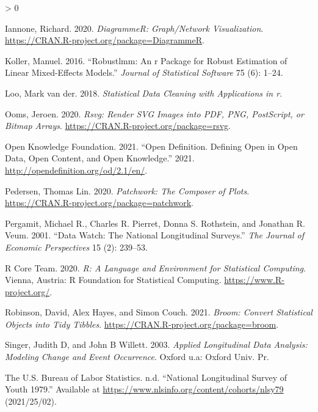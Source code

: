 \documentclass{article}
\newlength{\cslhangindent}
\newenvironment{CSLReferences}[2] %
 {%
  \setlength{\parindent}{0pt}
  \ifodd #1 \everypar{\setlength{\hangindent}{\cslhangindent}}\ignorespaces\fi
  \ifnum #2 > 0
  \setlength{\parskip}{#2\baselineskip}
  \fi
 }%
 {}
\begin{document}
\begin{CSLReferences}{1}{0}
\leavevmode\hypertarget{ref-DiagrammeR}{}%
Iannone, Richard. 2020. \emph{DiagrammeR: Graph/Network Visualization}. \url{https://CRAN.R-project.org/package=DiagrammeR}.

\leavevmode\hypertarget{ref-KollerManuel2016rARP}{}%
Koller, Manuel. 2016. {``Robustlmm: An r Package for Robust Estimation of Linear Mixed-Effects Models.''} \emph{Journal of Statistical Software} 75 (6): 1--24.

\leavevmode\hypertarget{ref-LooMarkvander2018Sdcw}{}%
Loo, Mark van der. 2018. \emph{Statistical Data Cleaning with Applications in r}.

\leavevmode\hypertarget{ref-rsvg}{}%
Ooms, Jeroen. 2020. \emph{Rsvg: Render SVG Images into PDF, PNG, PostScript, or Bitmap Arrays}. \url{https://CRAN.R-project.org/package=rsvg}.

\leavevmode\hypertarget{ref-opendata}{}%
Open Knowledge Foundation. 2021. {``Open Definition. Defining Open in Open Data, Open Content, and Open Knowledge.''} 2021. \url{http://opendefinition.org/od/2.1/en/}.

\leavevmode\hypertarget{ref-patchwork}{}%
Pedersen, Thomas Lin. 2020. \emph{Patchwork: The Composer of Plots}. \url{https://CRAN.R-project.org/package=patchwork}.

\leavevmode\hypertarget{ref-MichaelRPergamit2001DWTN}{}%
Pergamit, Michael R., Charles R. Pierret, Donna S. Rothstein, and Jonathan R. Veum. 2001. {``Data Watch: The National Longitudinal Surveys.''} \emph{The Journal of Economic Perspectives} 15 (2): 239--53.

\leavevmode\hypertarget{ref-R}{}%
R Core Team. 2020. \emph{R: A Language and Environment for Statistical Computing}. Vienna, Austria: R Foundation for Statistical Computing. \url{https://www.R-project.org/}.

\leavevmode\hypertarget{ref-broom}{}%
Robinson, David, Alex Hayes, and Simon Couch. 2021. \emph{Broom: Convert Statistical Objects into Tidy Tibbles}. \url{https://CRAN.R-project.org/package=broom}.

\leavevmode\hypertarget{ref-SingerJudithD2003Alda}{}%
Singer, Judith D, and John B Willett. 2003. \emph{Applied Longitudinal Data Analysis: Modeling Change and Event Occurrence}. Oxford u.a: Oxford Univ. Pr.

\leavevmode\hypertarget{ref-nlsy79}{}%
The U.S. Bureau of Labor Statistics. n.d. {``National Longitudinal Survey of Youth 1979.''} Available at \url{https://www.nlsinfo.org/content/cohorts/nlsy79} (2021/25/02).


\end{CSLReferences}
\end{document}
